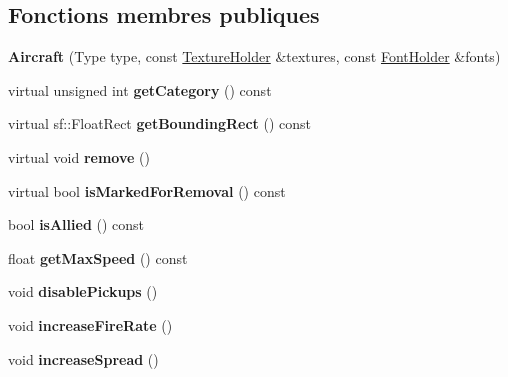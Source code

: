 \subsection*{Fonctions membres publiques}
\begin{DoxyCompactItemize}
\item 
\hypertarget{class_aircraft_a88290be2611c6dc415cb1e32223b790a}{}\label{class_aircraft_a88290be2611c6dc415cb1e32223b790a} 
{\bfseries Aircraft} (Type type, const \hyperlink{class_resource_holder}{Texture\+Holder} \&textures, const \hyperlink{class_resource_holder}{Font\+Holder} \&fonts)
\item 
\hypertarget{class_aircraft_a01f9042934c08ef18b62351e6bca320d}{}\label{class_aircraft_a01f9042934c08ef18b62351e6bca320d} 
virtual unsigned int {\bfseries get\+Category} () const
\item 
\hypertarget{class_aircraft_af9ec3d1e8298586e95f5f4bdde8f5791}{}\label{class_aircraft_af9ec3d1e8298586e95f5f4bdde8f5791} 
virtual sf\+::\+Float\+Rect {\bfseries get\+Bounding\+Rect} () const
\item 
\hypertarget{class_aircraft_a87e4abd58bf5844521988a9f97d5a5ae}{}\label{class_aircraft_a87e4abd58bf5844521988a9f97d5a5ae} 
virtual void {\bfseries remove} ()
\item 
\hypertarget{class_aircraft_a994039b523a54dac943fb4df4ed71d1c}{}\label{class_aircraft_a994039b523a54dac943fb4df4ed71d1c} 
virtual bool {\bfseries is\+Marked\+For\+Removal} () const
\item 
\hypertarget{class_aircraft_ab8503b05e0f3ede5986e7f0d4754afe0}{}\label{class_aircraft_ab8503b05e0f3ede5986e7f0d4754afe0} 
bool {\bfseries is\+Allied} () const
\item 
\hypertarget{class_aircraft_a64e22bc8086cd2d4c15a2b2b6be3b98c}{}\label{class_aircraft_a64e22bc8086cd2d4c15a2b2b6be3b98c} 
float {\bfseries get\+Max\+Speed} () const
\item 
\hypertarget{class_aircraft_a4f8baeaece69f71f61c4d1afce022a02}{}\label{class_aircraft_a4f8baeaece69f71f61c4d1afce022a02} 
void {\bfseries disable\+Pickups} ()
\item 
\hypertarget{class_aircraft_a285d3970515e3b37458204aaffc14892}{}\label{class_aircraft_a285d3970515e3b37458204aaffc14892} 
void {\bfseries increase\+Fire\+Rate} ()
\item 
\hypertarget{class_aircraft_a155d6b2120cd6de1317689e5bf0cbc4e}{}\label{class_aircraft_a155d6b2120cd6de1317689e5bf0cbc4e} 
void {\bfseries increase\+Spread} ()
\item 
\hypertarget{class_aircraft_ad9d53b569d28aec2d2d77d948c8ab33e}{}\label{class_aircraft_ad9d53b569d28aec2d2d77d948c8ab33e} 

\end{DoxyCompactItemize}
